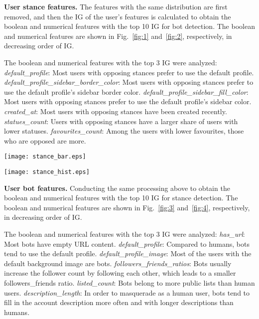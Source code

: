 \documentclass[10pt,twocolumn,letterpaper]{article}
\begin{document}
\noindent
\textbf{User stance features.}
The features with the same distribution are first removed, and then the IG of the user's features is calculated to obtain the boolean and numerical features with the top 10 IG for bot detection. The boolean and numerical features are shown in Fig.~\ref{fig:1} and~\ref{fig:2}, respectively, in decreasing order of IG.

The boolean and numerical features with the top 3 IG were analyzed: \emph{default\_profile}: Most users with opposing stances prefer to use the default profile. \emph{default\_profile\_sidebar\_border\_color}: Most users with opposing stances prefer to use the default profile's sidebar border color. \emph{default\_profile\_sidebar\_fill\_color}: Most users with opposing stances prefer to use the default profile's sidebar color. \emph{created\_at}: Most users with opposing stances have been created recently. \emph{statues\_count}: Users with opposing stances have a larger share of users with lower statuses. \emph{favourites\_count}: Among the users with lower favourites, those who are opposed are more.

\begin{figure*}[t]
  \centering
   \texttt{[image: stance\_bar.eps]}
   \vspace{-0.1cm}
   \caption{Distribution of boolean features with top 10 IG in stance detection.}
   \label{fig:1}
\end{figure*}
\vspace{-0.1cm}
\begin{figure*}[t]
  \centering
   \texttt{[image: stance\_hist.eps]}
   \vspace{-0.1cm}
   \caption{Distribution of numerical features with top 10 IG in stance detection.}
   \label{fig:2}
\end{figure*}


\noindent
\textbf{User bot features.}
Conducting the same processing above to obtain the boolean and numerical features with the top 10 IG for stance detection. The boolean and numerical features are shown in Fig.~\ref{fig:3} and~\ref{fig:4}, respectively, in decreasing order of IG.

The boolean and numerical features with the top 3 IG were analyzed: \emph{has\_url}: Most bots have empty URL content. \emph{default\_profile}: Compared to humans, bots tend to use the default profile. \emph{default\_profile\_image}: Most of the users with the default background image are bots. \emph{followers\_friends\_ratios}: Bots usually increase the follower count by following each other, which leads to a smaller followers\_friends ratio. \emph{listed\_count}: Bots belong to more public lists than human users. \emph{description\_length}: In order to masquerade as a human user, bots tend to fill in the account description more often and with longer descriptions than humans.
\end{document}
